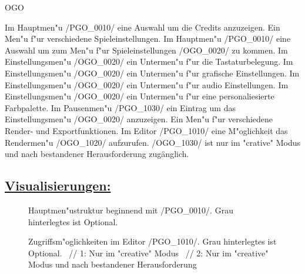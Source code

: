 \begin{ids}{\gls{OGO}}

	\id[0010] Im Hauptmen{"u} /PGO\_0010/ eine Auswahl um die Credits anzuzeigen.
	\id[0020] Ein Men{"u} f{"u}r verschiedene Spieleinstellungen.
	\id[0030] Im Hauptmen{"u} /PGO\_0010/ eine Auswahl um zum Men{"u} f{"u}r Spieleinstellungen /OGO\_0020/ zu kommen.
	\id[0040] Im Einstellungsmen{"u} /OGO\_0020/ ein Untermen{"u} f{"u}r die Tastaturbelegung.
	\id[0050] Im Einstellungsmen{"u} /OGO\_0020/ ein Untermen{"u} f{"u}r grafische Einstellungen.
	\id[0060] Im Einstellungsmen{"u} /OGO\_0020/ ein Untermen{"u} f{"u}r audio Einstellungen.
	\id[0070] Im Einstellungsmen{"u} /OGO\_0020/ ein Untermen{"u} f{"u}r eine personaliesierte Farbpalette.
	\id[1010] Im Pausenmen{"u} /PGO\_1030/ ein Eintrag um das Einstellungsmen{"u} /OGO\_0020/ anzuzeigen.
	\id[1020] Ein Men{"u} f{"u}r verschiedene Render- und Exportfunktionen.
	\id[1030] Im Editor /PGO\_1010/ eine M{"o}glichkeit das Rendermen{"u} /OGO\_1020/ aufzurufen.
	\id[1040] /OGO\_1030/ ist nur im "crative" Modus und nach bestandener Herausforderung zugänglich.
\end{ids}



%
%
%
\clearpage

\subsection*{\underline{Visualisierungen:}}

\begin{landscape}

	\begin{figure}[h]
		\centering
	 	
	 	\caption{Hauptmen{"u}struktur beginnend mit /PGO\_0010/. Grau hinterlegtes ist Optional.}
	\end{figure}
	
\end{landscape}

\clearpage

\begin{landscape}

	\begin{figure}[h]
		\centering
	 	
	 	\caption{Zugriffsm{"o}glichkeiten im Editor /PGO\_1010/. Grau hinterlegtes ist Optional. ~//
			1: Nur im "creative" Modus ~//
			2: Nur im "creative" Modus und nach bestandener Herausforderung}
	\end{figure}
	
\end{landscape}
	
